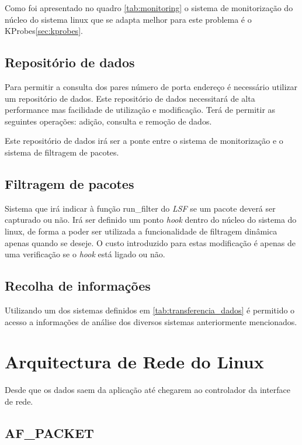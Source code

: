 Como foi apresentado no quadro \ref{tab:monitoring} o sistema de monitorização
do núcleo do sistema linux que se adapta melhor para este problema é o
KProbes\ref{sec:kprobes}. 

\subsection{Repositório de dados}

Para permitir a consulta dos pares número de porta endereço é necessário
utilizar um repositório de dados. Este repositório de dados necessitará de alta
performance mas facilidade de utilização e modificação. Terá de permitir as
seguintes operações: adição, consulta e remoção de dados.

Este repositório de dados irá ser a ponte entre o sistema de  monitorização e o
sistema de filtragem de pacotes. 

\subsection{Filtragem de pacotes}

Sistema que irá indicar à função run\_filter do \textit{LSF} se um pacote deverá
ser capturado ou não. Irá ser definido um ponto \textit{hook} dentro do núcleo
do sistema do linux, de forma a poder ser utilizada a funcionalidade de
filtragem dinâmica apenas quando se deseje. O custo introduzido para estas
modificação é apenas de uma verificação se o \textit{hook} está ligado ou não.


\subsection{Recolha de informações}

Utilizando um dos sistemas definidos em \ref{tab:transferencia_dados} é
permitido o acesso a informações de análise dos diversos sistemas anteriormente
mencionados.


\section{Arquitectura de Rede do Linux}

Desde que os dados saem da aplicação até chegarem ao controlador da interface
de rede. 

\subsection{AF\_PACKET}


